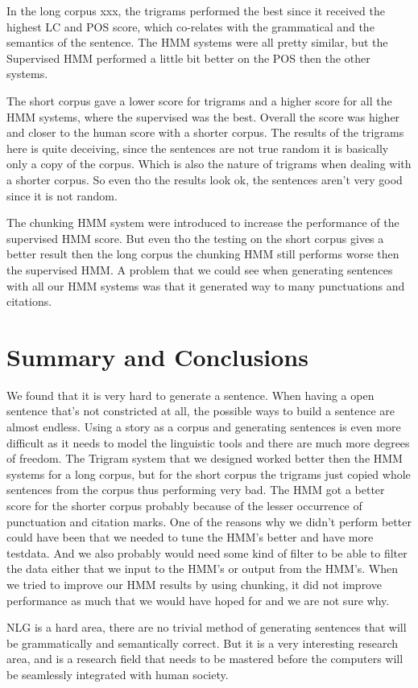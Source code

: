 \documentclass[a4paper,12pt]{article}
\begin{document}
In the long corpus xxx, the trigrams performed the best since it received the highest LC and POS score, which co-relates with the
grammatical and the semantics of the sentence. The HMM systems were all pretty similar, but the Supervised HMM performed
a little bit better on the POS then the other systems.

The short corpus gave a lower score for trigrams and a higher score for all the HMM systems, where the supervised was the best.
Overall the score was higher and closer to the human score with a shorter corpus.
The results of the trigrams here is quite deceiving, since the sentences are not true random it is basically only a copy of the 
corpus. Which is also the nature of trigrams when dealing with a shorter corpus. So even tho the results look ok, the sentences
aren't very good since it is not random.

The chunking HMM system were introduced to increase the performance of the supervised HMM score. But even tho the
testing on the short corpus gives a better result then the long corpus the chunking HMM still performs worse then the 
supervised HMM.
A problem that we could see when generating sentences with all our HMM systems was that it generated way to many punctuations and citations.

\section{Summary and Conclusions}
We found that it is very hard to generate a sentence. When having a open sentence that's not constricted at all, 
the possible ways to build a sentence are almost endless. Using a story as a corpus and generating sentences 
is even more difficult as it needs to model the linguistic tools and there are much more degrees of freedom.
The Trigram system that we designed worked better then the HMM systems for a long corpus, but for the short corpus
the trigrams just copied whole sentences from the corpus thus performing very bad. 
The HMM got a better score for the shorter corpus probably because of the lesser occurrence of punctuation and citation marks.
One of the reasons why we didn't perform better could have been that we needed to tune the HMM's better and have more
testdata. And we also probably would need some kind of filter to be able to filter the data either that we input to the HMM's or
output from the HMM's.
When we tried to improve our HMM results by using chunking, it did not improve performance as much that we would 
have hoped for and we are not sure why.

NLG is a hard area, there are no trivial method of generating sentences that will be grammatically and semantically correct.
But it is a very interesting research area, and is a research field that needs to be mastered before the computers will be seamlessly integrated with human society.
\label{sec:summary}


\end{document}
